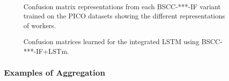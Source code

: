 \begin{figure}
{} \\
\caption{Confusion matrix representations from each BSCC-***-IF variant trained on the PICO datasets 
showing the different representations of workers. 
}
\label{fig:conf_mat_clusters}

\end{figure}

\begin{figure}
\centering
{}
\caption{Confusion matrices learned for the integrated LSTM using BSCC-***-IF+LSTm. }
\label{fig:conf_mat_lstm}
\end{figure}

\subsubsection{Examples of Aggregation}

